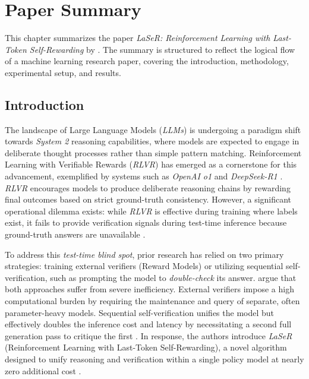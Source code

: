 \documentclass[a4paper,oneside,10pt,ngerman,english]{scrartcl}
\begin{document}

\section{Paper Summary}
\label{sec:papersummary}

This chapter summarizes the paper \textit{LaSeR: Reinforcement Learning with Last-Token Self-Rewarding} by \citet{laser}. The summary is structured to reflect the logical flow of a machine learning research paper, covering the introduction, methodology, experimental setup, and results.

\subsection{Introduction}
The landscape of Large Language Models (\textit{LLMs}) is undergoing a paradigm shift towards \textit{System 2} reasoning capabilities, where models are expected to engage in deliberate thought processes rather than simple pattern matching. Reinforcement Learning with Verifiable Rewards (\textit{RLVR}) has emerged as a cornerstone for this advancement, exemplified by systems such as \textit{OpenAI o1} and \textit{DeepSeek-R1} \citep{r1}. \textit{RLVR} encourages models to produce deliberate reasoning chains by rewarding final outcomes based on strict ground-truth consistency. However, a significant operational dilemma exists: while \textit{RLVR} is effective during training where labels exist, it fails to provide verification signals during test-time inference because ground-truth answers are unavailable \citep{laser}.

To address this \textit{test-time blind spot}, prior research has relied on two primary strategies: training external verifiers (Reward Models) or utilizing sequential self-verification, such as prompting the model to \textit{double-check} its answer. \citet{laser} argue that both approaches suffer from severe inefficiency. External verifiers impose a high computational burden by requiring the maintenance and query of separate, often parameter-heavy models. Sequential self-verification unifies the model but effectively doubles the inference cost and latency by necessitating a second full generation pass to critique the first \citep{laser}. In response, the authors introduce \textit{LaSeR} (Reinforcement Learning with Last-Token Self-Rewarding), a novel algorithm designed to unify reasoning and verification within a single policy model at nearly zero additional cost \citep{laser}.
\end{document}

